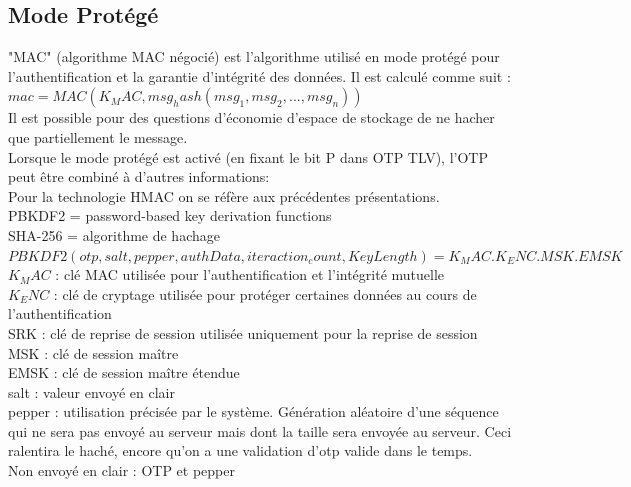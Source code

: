 \documentclass{../res/univ-projet}
\begin{document}
\subsection{Mode Protégé}
"MAC" (algorithme MAC négocié) est l'algorithme utilisé en mode protégé pour l'authentification et la garantie d'intégrité des données.
Il est calculé comme suit : \\
$mac = MAC(K_MAC, msg_hash(msg_1, msg_2, ..., msg_n))$\\
Il est possible pour des questions d'économie d'espace de stockage de ne hacher que partiellement le message.\\


Lorsque le mode protégé est activé (en fixant le bit P dans OTP TLV), l'OTP peut être combiné à d'autres informations:\\

Pour la technologie HMAC on se réfère aux précédentes présentations.\\
PBKDF2 = password-based key derivation functions\\
SHA-256 = algorithme de hachage\\
$PBKDF2(otp,salt,pepper,authData,iteraction_count,Key Length) = K_MAC.K_ENC.MSK.EMSK$\\


$K_MAC$ : clé MAC utilisée pour l'authentification et l'intégrité mutuelle\\
$K_ENC$ : clé de cryptage utilisée pour protéger certaines données au cours de l'authentification\\
SRK : clé de reprise de session utilisée uniquement pour la reprise de session\\
MSK : clé de session maître\\
EMSK : clé de session maître étendue\\
salt : valeur envoyé en clair\\
pepper : utilisation précisée par le système. Génération aléatoire d'une séquence qui ne sera pas envoyé au serveur mais dont la taille sera envoyée au serveur. Ceci ralentira le haché, encore qu'on a une validation d'otp valide dans le temps.\\

Non envoyé en clair : OTP et pepper
\end{document}
